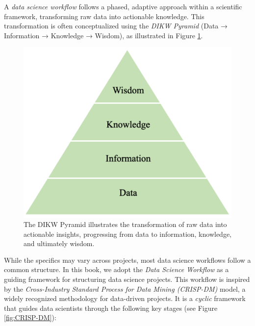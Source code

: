 \documentclass[
]{book}
\theoremstyle{definition}
\theoremstyle{definition}
\theoremstyle{definition}
\theoremstyle{definition}
\theoremstyle{remark}
\begin{document}
A \emph{data science workflow} follows a phased, adaptive approach within a scientific framework, transforming raw data into actionable knowledge. This transformation is often conceptualized using the \emph{DIKW Pyramid} (Data → Information → Knowledge → Wisdom), as illustrated in Figure \ref{fig:DIKW-Pyramid}.

\begin{figure}

{\centering \includegraphics[width=0.4\linewidth]{images/DIKW-Pyramid} 

}

\caption{The DIKW Pyramid illustrates the transformation of raw data into actionable insights, progressing from data to information, knowledge, and ultimately wisdom.}\label{fig:DIKW-Pyramid}
\end{figure}

While the specifics may vary across projects, most data science workflows follow a common structure. In this book, we adopt the \emph{Data Science Workflow} as a guiding framework for structuring data science projects. This workflow is inspired by the \emph{Cross-Industry Standard Process for Data Mining (CRISP-DM)} model, a widely recognized methodology for data-driven projects. It is a \emph{cyclic} framework that guides data scientists through the following key stages (see Figure \ref{fig:CRISP-DM}):
\end{document}
